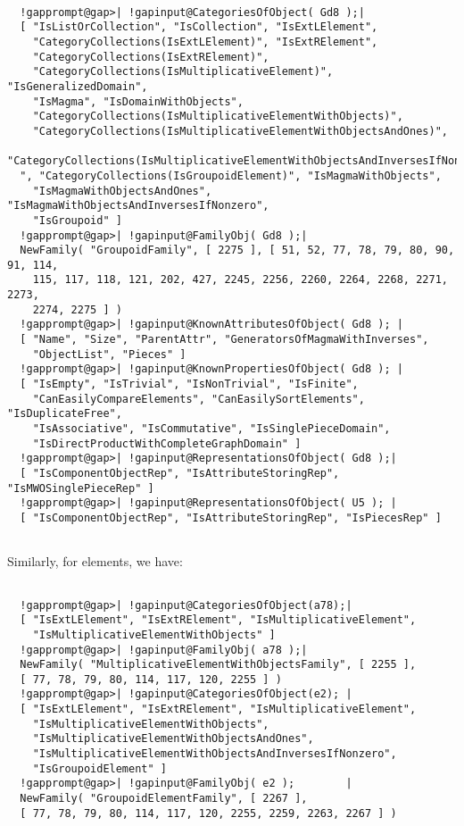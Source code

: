 \documentclass[a4paper,11pt]{report}
\begin{document}
{{ 
\begin{Verbatim}[commandchars=!@|,fontsize=\small,frame=single,label=Example]
  
  !gapprompt@gap>| !gapinput@CategoriesOfObject( Gd8 );|
  [ "IsListOrCollection", "IsCollection", "IsExtLElement", 
    "CategoryCollections(IsExtLElement)", "IsExtRElement", 
    "CategoryCollections(IsExtRElement)", 
    "CategoryCollections(IsMultiplicativeElement)", "IsGeneralizedDomain", 
    "IsMagma", "IsDomainWithObjects", 
    "CategoryCollections(IsMultiplicativeElementWithObjects)", 
    "CategoryCollections(IsMultiplicativeElementWithObjectsAndOnes)", 
    "CategoryCollections(IsMultiplicativeElementWithObjectsAndInversesIfNonzero)\
  ", "CategoryCollections(IsGroupoidElement)", "IsMagmaWithObjects", 
    "IsMagmaWithObjectsAndOnes", "IsMagmaWithObjectsAndInversesIfNonzero", 
    "IsGroupoid" ]
  !gapprompt@gap>| !gapinput@FamilyObj( Gd8 );|
  NewFamily( "GroupoidFamily", [ 2275 ], [ 51, 52, 77, 78, 79, 80, 90, 91, 114, 
    115, 117, 118, 121, 202, 427, 2245, 2256, 2260, 2264, 2268, 2271, 2273, 
    2274, 2275 ] )
  !gapprompt@gap>| !gapinput@KnownAttributesOfObject( Gd8 ); |
  [ "Name", "Size", "ParentAttr", "GeneratorsOfMagmaWithInverses", 
    "ObjectList", "Pieces" ]
  !gapprompt@gap>| !gapinput@KnownPropertiesOfObject( Gd8 ); |
  [ "IsEmpty", "IsTrivial", "IsNonTrivial", "IsFinite", 
    "CanEasilyCompareElements", "CanEasilySortElements", "IsDuplicateFree", 
    "IsAssociative", "IsCommutative", "IsSinglePieceDomain", 
    "IsDirectProductWithCompleteGraphDomain" ]
  !gapprompt@gap>| !gapinput@RepresentationsOfObject( Gd8 );|
  [ "IsComponentObjectRep", "IsAttributeStoringRep", "IsMWOSinglePieceRep" ]
  !gapprompt@gap>| !gapinput@RepresentationsOfObject( U5 ); |
  [ "IsComponentObjectRep", "IsAttributeStoringRep", "IsPiecesRep" ]
  
\end{Verbatim}
 Similarly, for elements, we have: 

 
\begin{Verbatim}[commandchars=!@|,fontsize=\small,frame=single,label=Example]
  
  !gapprompt@gap>| !gapinput@CategoriesOfObject(a78);|
  [ "IsExtLElement", "IsExtRElement", "IsMultiplicativeElement", 
    "IsMultiplicativeElementWithObjects" ]
  !gapprompt@gap>| !gapinput@FamilyObj( a78 );|
  NewFamily( "MultiplicativeElementWithObjectsFamily", [ 2255 ], 
  [ 77, 78, 79, 80, 114, 117, 120, 2255 ] )
  !gapprompt@gap>| !gapinput@CategoriesOfObject(e2); |
  [ "IsExtLElement", "IsExtRElement", "IsMultiplicativeElement", 
    "IsMultiplicativeElementWithObjects", 
    "IsMultiplicativeElementWithObjectsAndOnes", 
    "IsMultiplicativeElementWithObjectsAndInversesIfNonzero", 
    "IsGroupoidElement" ]
  !gapprompt@gap>| !gapinput@FamilyObj( e2 );        |
  NewFamily( "GroupoidElementFamily", [ 2267 ], 
  [ 77, 78, 79, 80, 114, 117, 120, 2255, 2259, 2263, 2267 ] )
  

\end{Verbatim}}}
\end{document}
